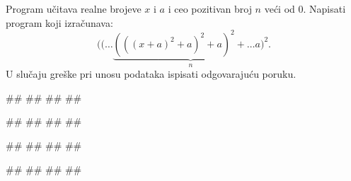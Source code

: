 \begin{Exercise}[label=p1.7_razno9] 
Program učitava realne brojeve $x$ i $a$ i ceo pozitivan broj $n$ veći
od $0$.  Napisati program koji izračunava:
 $$((\ldots \underbrace{(((x+a)^2 + a)^2 + a)^2 + \ldots a)^2}_n.$$ U
slučaju greške pri unosu podataka ispisati odgovarajuću poruku. 

\begin{miditest}
\begin{upotreba}{1}
#\naslovInt#
##
##
##
\end{upotreba}
\end{miditest}
\begin{miditest}
\begin{upotreba}{2}
#\naslovInt#
##
##
##
\end{upotreba}
\end{miditest}

\begin{miditest}
\begin{upotreba}{3}
#\naslovInt#
##
##
##
\end{upotreba}
\end{miditest}
\begin{miditest}
\begin{upotreba}{4}
#\naslovInt#
##
##
##
\end{upotreba}
\end{miditest}
\end{Exercise}
\begin{Answer}[ref=p1.7_razno9]
\end{Answer}




